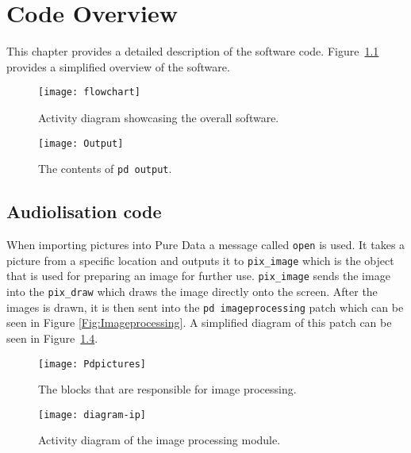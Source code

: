 \chapter{Code Overview}\label{ch:codeoverview}
This chapter provides a detailed description of the software code. Figure~\ref{fig:flowchart} provides a simplified overview of the software.

\begin{figure}
\centering
\texttt{[image: flowchart]}
\caption{Activity diagram showcasing the overall software.}
\label{fig:flowchart}
\end{figure}

\begin{figure}
\centering
\texttt{[image: Output]}
\caption{The contents of \texttt{pd output}.}
\label{Fig:Output}
\end{figure}

\section{Audiolisation code}
When importing pictures into Pure Data a message called \texttt{open} is used. It takes a picture from a specific location and outputs it to \texttt{pix\_image} which is the object that is used for preparing an image for further use. \texttt{pix\_image} sends the image into the \texttt{pix\_draw} which draws the image directly onto the screen. After the images is drawn, it is then sent into the \texttt{pd imageprocessing} patch which can be seen in Figure \ref{Fig:Imageprocessing}. A simplified diagram of this patch can be seen in Figure~\ref{fig:ipflowchart}.

\begin{figure}
\centering
\texttt{[image: Pdpictures]}
\caption{The blocks that are responsible for image processing.}
\label{Fig:pdpicture}
\end{figure}

\begin{figure}
\centering
\texttt{[image: diagram-ip]}
\caption{Activity diagram of the image processing module.}
\label{fig:ipflowchart}
\end{figure}

